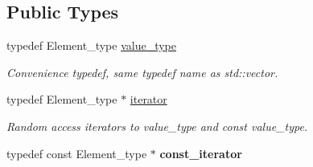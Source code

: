 \subsection*{Public Types}
\begin{DoxyCompactItemize}
\item 
\mbox{\label{classMem__root__array__YY_a7cd544d399ee0cf1ac196fbf0da8b3ff}} 
typedef Element\+\_\+type \mbox{\hyperlink{classMem__root__array__YY_a7cd544d399ee0cf1ac196fbf0da8b3ff}{value\+\_\+type}}
\begin{DoxyCompactList}\small\item\em Convenience typedef, same typedef name as std\+::vector. \end{DoxyCompactList}\item 
\mbox{\label{classMem__root__array__YY_a567571c6fba9dc6615c0ec772743ee67}} 
typedef Element\+\_\+type $\ast$ \mbox{\hyperlink{classMem__root__array__YY_a567571c6fba9dc6615c0ec772743ee67}{iterator}}
\begin{DoxyCompactList}\small\item\em Random access iterators to value\+\_\+type and const value\+\_\+type. \end{DoxyCompactList}\item 
\mbox{\label{classMem__root__array__YY_afa721a4338ab28f67c058b2a197b26ab}} 
typedef const Element\+\_\+type $\ast$ {\bfseries const\+\_\+iterator}
\end{DoxyCompactItemize}
